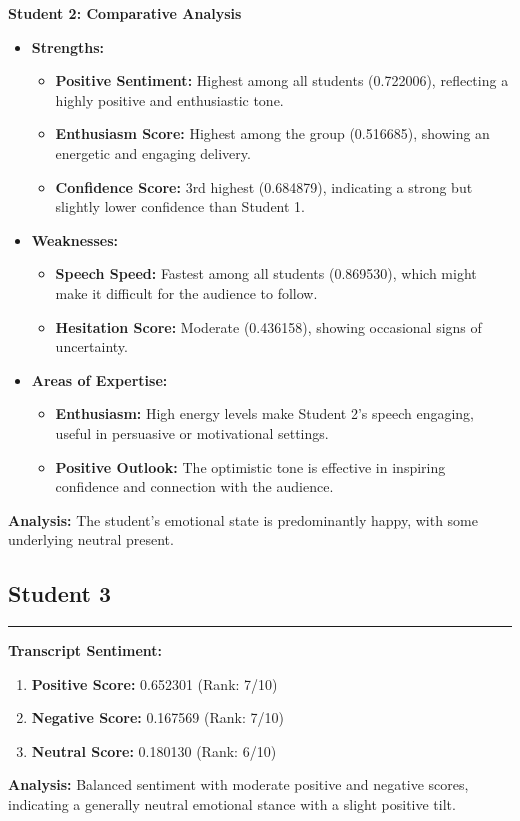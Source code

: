 \documentclass{article}
\begin{document}
\vspace{0.2in}
\textbf{Student 2: Comparative Analysis}
\begin{itemize}
    \item \textbf{Strengths:}
    \begin{itemize}
        \item \textbf{Positive Sentiment:} Highest among all students (0.722006), reflecting a highly positive and enthusiastic tone.
        \item \textbf{Enthusiasm Score:} Highest among the group (0.516685), showing an energetic and engaging delivery.
        \item \textbf{Confidence Score:} 3rd highest (0.684879), indicating a strong but slightly lower confidence than Student 1.
    \end{itemize}
    \item \textbf{Weaknesses:}
    \begin{itemize}
        \item \textbf{Speech Speed:} Fastest among all students (0.869530), which might make it difficult for the audience to follow.
        \item \textbf{Hesitation Score:} Moderate (0.436158), showing occasional signs of uncertainty.
    \end{itemize}
    \item \textbf{Areas of Expertise:}
    \begin{itemize}
        \item \textbf{Enthusiasm:} High energy levels make Student 2's speech engaging, useful in persuasive or motivational settings.
        \item \textbf{Positive Outlook:} The optimistic tone is effective in inspiring confidence and connection with the audience.
    \end{itemize}
\end{itemize}
    \textbf{Analysis:} The student's emotional state is predominantly happy, with some underlying neutral present.
    \vspace{0.3in}
\subsection{Student 3}
\begin{center}
    \color{green}\rule{1\linewidth}{0.7mm}
\end{center}
\large{\textbf{Transcript Sentiment:}}
\begin{tcolorbox}[title=Sentiment Breakdown]
    \begin{enumerate}
        \item \textbf{Positive Score:} \textcolor{green!70!black}{0.652301} (Rank: 7/10)
        \item \textbf{Negative Score:} \textcolor{red!70!black}{0.167569} (Rank: 7/10)
        \item \textbf{Neutral Score:} \textcolor{blue!70!black}{0.180130} (Rank: 6/10)
    \end{enumerate}
\end{tcolorbox}
\textbf{Analysis:} Balanced sentiment with moderate positive and negative scores, indicating a generally neutral emotional stance with a slight positive tilt.
\end{document}
